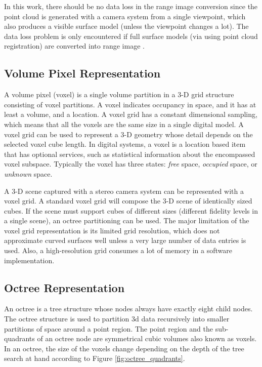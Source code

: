 \documentclass[12pt,a4paper,oneside,pdftex]{report}
\begin{document}
In this work, there should be no data loss in the range image conversion since the point cloud is generated with a camera system from a single viewpoint, which also produces a visible surface model (unless the viewpoint changes a lot). The data loss problem is only encountered if full surface models (via using point cloud registration) are converted into range image \citep{Unnikrishnan08}.

\subsection{Volume Pixel Representation}
\label{subsection:volume_pixel_representation}

A volume pixel (voxel) is a single volume partition in a 3-D grid structure consisting of voxel partitions. A voxel indicates occupancy in space, and it has at least a volume, and a location. A voxel grid has a constant dimensional sampling, which means that all the voxels are the same size in a single digital model. A voxel grid can be used to represent a 3-D geometry whose detail depends on the selected voxel cube length. In digital systems, a voxel is a location based item that has optional services, such as statistical information about the encompassed voxel subspace. Typically the voxel has three states: \emph{free} space, \emph{occupied} space, or \emph{unknown} space.

A 3-D scene captured with a stereo camera system can be represented with a voxel grid. A standard voxel grid will compose the 3-D scene of identically sized cubes. If the scene must support cubes of different sizes (different fidelity levels in a single scene), an octree partitioning can be used. The major limitation of the voxel grid representation is its limited grid resolution, which does not approximate curved surfaces well unless a very large number of data entries is used. Also, a high-resolution grid consumes a lot of memory in a software implementation.

\subsection{Octree Representation}
\label{subsection:octree_representation}

An octree is a tree structure whose nodes always have exactly eight child nodes. The octree structure is used to partition 3d data recursively into smaller partitions of space around a point region\citep{Laine11}. The point region and the sub-quadrants of an octree node are symmetrical cubic volumes also known as voxels. In an octree, the size of the voxels change depending on the depth of the tree search at hand according to Figure \ref{fig:octree_quadrants}.
\end{document}
